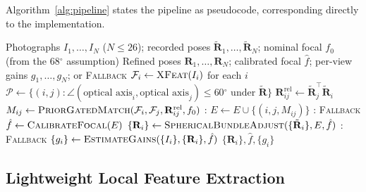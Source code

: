 \documentclass[11pt]{article}
\newcommand{\mat}[1]{\mathbf{#1}}
\newcommand{\Deg}{\ensuremath{^{\circ}}}
\begin{document}
Algorithm~\ref{alg:pipeline} states the pipeline as pseudocode, corresponding directly to the implementation.

\begin{algorithm}[h]
\caption{On-device pose and lens refinement}
\label{alg:pipeline}
\begin{algorithmic}[1]
\Require Photographs $I_1,\dots,I_N$ ($N\le 26$); recorded poses $\tilde{\mat{R}}_1,\dots,\tilde{\mat{R}}_N$; nominal focal $f_0$ (from the $68\Deg$ assumption)
\Ensure Refined poses $\mat{R}_1,\dots,\mat{R}_N$; calibrated focal $\hat f$; per-view gains $g_1,\dots,g_N$; or \textsc{Fallback}
\State $\mathcal{F}_i \gets \textsc{XFeat}(I_i)$ for each $i$ 
\State $\mathcal{P} \gets \{(i,j) : \angle(\text{optical axis}_i, \text{optical axis}_j) \le 60\Deg \text{ under } \tilde{\mat{R}}\}$ 
  \State $\mat{R}^{\mathrm{rel}}_{ij} \gets \tilde{\mat{R}}_j^{\!\top}\tilde{\mat{R}}_i$
  \State $M_{ij} \gets \textsc{PriorGatedMatch}(\mathcal{F}_i, \mathcal{F}_j, \mat{R}^{\mathrm{rel}}_{ij}, f_0)$ \Comment{\S\ref{sec:matching}}
  : $E \gets E \cup \{(i,j,M_{ij})\}$ \EndIf
\EndFor
{}: \Return \textsc{Fallback} \EndIf
\State $\hat f \gets \textsc{CalibrateFocal}(E)$ 
\State $\{\mat{R}_i\} \gets \textsc{SphericalBundleAdjust}(\{\tilde{\mat{R}}_i\}, E, \hat f)$ 
\If{$\hat\theta_h \notin [45\Deg, 95\Deg]$ \textbf{or} mean correction $> 25\Deg$}: \Return \textsc{Fallback} 
\EndIf
\State $\{g_i\} \gets \textsc{EstimateGains}(\{I_i\}, \{\mat{R}_i\}, \hat f)$ 
\State \Return $\{\mat{R}_i\}, \hat f, \{g_i\}$
\end{algorithmic}
\end{algorithm}

\subsection{Lightweight Local Feature Extraction}
\label{sec:xfeat}
\end{document}
